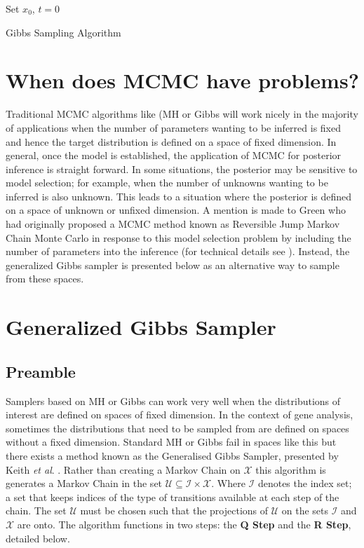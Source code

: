 \begin{algorithm}[H]
 Set $x_0$, $t=0$\; 
  \caption{Gibbs Sampling Algorithm}
\end{algorithm}

\section{When does MCMC have problems?}
Traditional MCMC algorithms like (MH or Gibbs will work nicely in the majority of applications when the number of parameters wanting to be inferred is fixed and hence the target distribution is defined on a space of fixed dimension. In general, once the model is established, the application of MCMC for posterior inference is straight forward. In some situations, the posterior may be sensitive to model selection; for example, when the number of unknowns wanting to be inferred is also unknown. This leads to a situation where the posterior is defined on a space of unknown or unfixed dimension. A mention is made to Green who had originally proposed a MCMC method known as Reversible Jump Markov Chain Monte Carlo in response to this model selection problem by including the number of parameters into the inference  (for technical details see \cite{green1995reversible,  waagepetersen2001tutorial}). Instead, the generalized Gibbs sampler is presented below as an alternative way to sample from these spaces.
\section{Generalized Gibbs Sampler}

\subsection{Preamble} 
Samplers based on MH or Gibbs can work very well when the distributions of interest are defined on spaces of fixed dimension. In the context of gene analysis, sometimes the distributions that need to be sampled from are defined on spaces without a fixed dimension. Standard MH or Gibbs fail in spaces like this but there exists a method known as the Generalised Gibbs Sampler, presented by Keith \emph{et al}. \cite{keith2004generalized}. {\color{red}{It can be shown that reversible jump is a speciial case (MAYBE MENTION THIS AT END?)}} 
Rather than creating a Markov Chain on ${\mathscr X}$ this algorithm is generates a Markov Chain in the set $\mathscr U \subseteq \mathscr I \times \mathscr X$. Where $\mathscr I$ denotes the index set; a set that keeps indices of the type of transitions available at each step of the chain. The set $\mathscr U$ must be chosen such that the projections of $\mathscr U$ on the sets $\mathscr I$ and $\mathscr X$ are onto. The algorithm functions in two steps: the \textbf{Q Step} and the \textbf{R Step}, detailed below. 

